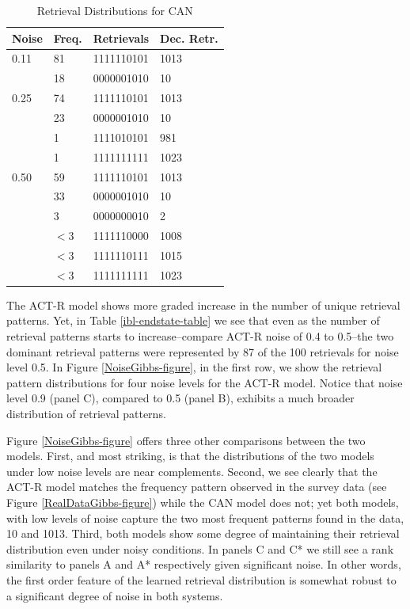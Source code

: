 \documentclass[10pt,letterpaper]{article}
\begin{document}
\begin{table}[H]
\begin{center} 
\caption{Retrieval Distributions for CAN} 
\label{can-endstate-table} 
\vskip 0.12in
\begin{tabular}{llll} 
\hline
Noise  & Freq.  &  Retrievals & Dec. Retr.\\
\hline
0.11    & 81  &    1111110101 & 1013 \\
& 18    & 0000001010 & 10 \\
\hline
0.25    & 74  &    1111110101 & 1013 \\
& 23    & 0000001010 & 10 \\
     & 1 & 1111010101 & 981 \\
     & 1 & 1111111111 & 1023\\
\hline
0.50    & 59  &    1111110101 & 1013 \\
& 33    & 0000001010 & 10 \\
             & 3 & 0000000010 & 2 \\
        & $<3$ & 1111110000 & 1008\\
        & $<3$ & 1111110111 & 1015\\
        & $<3$ & 1111111111 & 1023\\
\hline
\end{tabular} 
\end{center} 
\end{table}

The ACT-R model shows more graded increase in the number of unique retrieval patterns. Yet, in Table \ref{ibl-endstate-table} we see that even as the number of retrieval patterns starts to increase--compare ACT-R noise of 0.4 to 0.5--the two dominant retrieval patterns were represented by 87 of the 100 retrievals for noise level 0.5.  In Figure \ref{NoiseGibbs-figure}, in the first row, we show the retrieval pattern distributions for four noise levels for the ACT-R model. Notice that noise level 0.9 (panel C), compared to 0.5 (panel B), exhibits a much broader distribution of retrieval patterns. 

Figure \ref{NoiseGibbs-figure} offers three other comparisons between the two models. First, and most striking, is that the distributions of the two models under low noise levels are near complements. Second, we see clearly that the ACT-R model matches the frequency pattern observed in the survey data (see Figure \ref{RealDataGibbs-figure}) while the CAN model does not; yet both models, with low levels of noise capture the two most frequent patterns found in the data, 10 and 1013. Third, both models show some degree of maintaining their retrieval distribution even under noisy conditions. In panels C and C* we still see a rank similarity to panels A and A* respectively given significant noise. In other words, the first order feature of the learned retrieval distribution is somewhat robust to a significant degree of noise in both systems.
\end{document}
